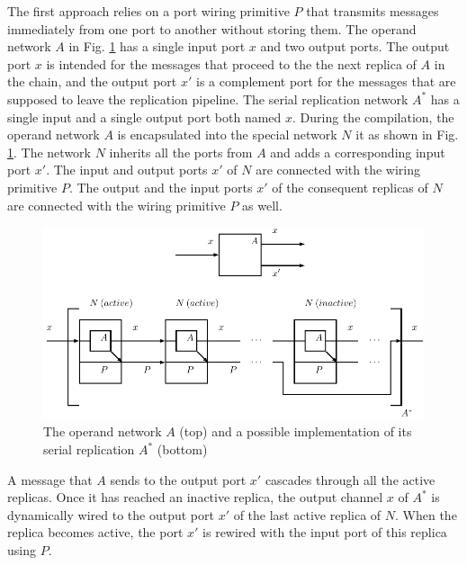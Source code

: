 The first approach relies on a port wiring primitive $P$ that transmits messages immediately from one port to another without storing them. The operand network $A$ in Fig. \ref{fig:ffp_new} has a single input port $x$ and two output ports. The output port $x$ is intended for the messages that proceed to the the next replica of $A$ in the chain, and the output port $x'$ is a complement port for the messages that are supposed to leave the replication pipeline. The serial replication network $A^{*}$ has a single input and a single output port both named $x$. During the compilation, the operand network $A$ is encapsulated into the special network $N$ it as shown in Fig. \ref{fig:ffp_new}. The network $N$ inherits all the ports from $A$ and adds a corresponding input port $x'$. The input and output ports $x'$ of $N$ are connected with the wiring primitive $P$. The output and the input ports $x'$ of the consequent replicas of $N$ are connected with the wiring primitive $P$ as well.
\begin{figure}[h!]
\centering
\includegraphics[scale=0.8]{figs/chapter_04_ffp_new.pdf}
\caption{The operand network $A$ (top) and a possible implementation of its serial replication $A^{*}$ (bottom)}
\label{fig:ffp_new}
\end{figure}
A message that $A$ sends to the output port $x'$ cascades through all the active replicas. Once it has reached an inactive replica, the output channel $x$ of $A^{*}$ is dynamically wired to the output port $x'$ of the last active replica of $N$. When the replica becomes active, the port $x'$ is rewired with the input port of this replica using $P$.

